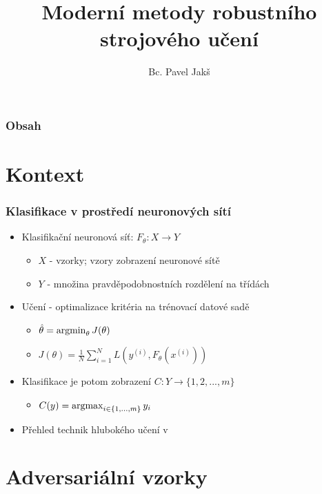 \documentclass[czech]{beamer}
\title{Moderní metody robustního strojového učení}
\author{Bc. Pavel Jakš}
\institute{Matematická informatika, FJFI ČVUT v Praze}
\begin{document}

\frame{\titlepage}

\begin{frame}
    \frametitle{Obsah}
    \tableofcontents
\end{frame}

\section{Kontext}

\begin{frame}
    \frametitle{Klasifikace v prostředí neuronových sítí}
    \begin{itemize}
        \item Klasifikační neuronová síť: $F_\theta : X \rightarrow Y$
        \begin{itemize}
            \item $X$ - vzorky; vzory zobrazení neuronové sítě
            \item $Y$ - množina pravděpodobnostních rozdělení na třídách
        \end{itemize}
        \item Učení - optimalizace kritéria na trénovací datové sadě
        \begin{itemize}
            \item $\hat{\theta} = \operatornamewithlimits{argmin}_{\theta} J(\theta)$
            \item $J(\theta) = \frac{1}{N} \sum_{i=1}^{N} L(y^{(i)}, F_\theta(x^{(i)}))$
        \end{itemize}
        \item Klasifikace je potom zobrazení $C: Y \rightarrow \{1, 2, ..., m\}$
        \begin{itemize}
            \item $C(y) = \operatornamewithlimits{argmax}_{i \in \{1, ..., m\}} y_i$
        \end{itemize}
        \item Přehled technik hlubokého učení v \cite{Goodfellow}
    \end{itemize}
\end{frame}

\section{Adversariální vzorky}
\end{document}
